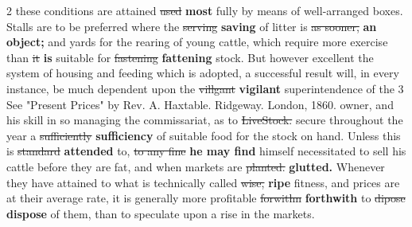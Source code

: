 \documentclass[10pt]{article}
\begin{document}
\begin{multicols}{2}
these conditions are attained \sout{used} \textbf{most} fully by means of well-arranged boxes. Stalls are to be preferred where the \sout{serving} \textbf{saving} of litter is \sout{as sooner,} \textbf{an object;} and yards for the rearing of young cattle, which require more exercise than \sout{it} \textbf{is} suitable for \sout{fastening} \textbf{fattening} stock. But however excellent the system of housing and feeding which is adopted, a successful result will, in every instance, be much dependent upon the \sout{villgant} \textbf{vigilant} superintendence of the 3 See "Present Prices" by Rev. A. Haxtable. Ridgeway. London, 1860. owner, and his skill in so managing the commissariat, as to \sout{LiveStock.} secure throughout the year a \sout{sufficiently} \textbf{sufficiency} of suitable food for the stock on hand. Unless this is \sout{standard} \textbf{attended} to, \sout{to any fine} \textbf{he may find} himself necessitated to sell his cattle before they are fat, and when markets are \sout{planted.} \textbf{glutted.} Whenever they have attained to what is technically called \sout{wise,} \textbf{ripe} fitness, and prices are at their average rate, it is generally more profitable \sout{forwithn} \textbf{forthwith} to \sout{dipose} \textbf{dispose} of them, than to speculate upon a rise in the markets.


\end{multicols}
\end{document}
